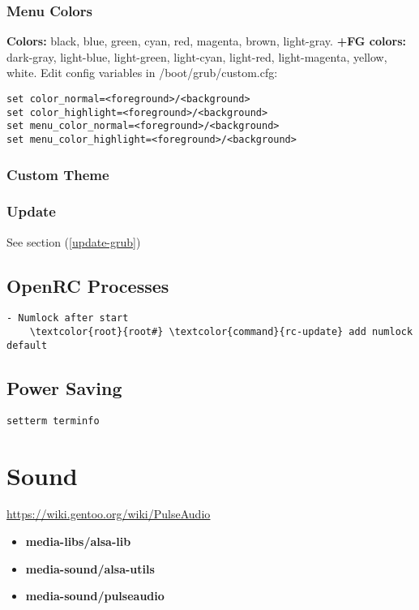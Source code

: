 \documentclass[10pt, a4paper, onecolumn, openany]{book}         %
\begin{document}
\subsection{Menu Colors}
\textbf{Colors:} black, blue, green, cyan, red, magenta, brown, light-gray.\newline
\textbf{+FG colors:} dark-gray, light-blue, light-green, light-cyan, light-red, light-magenta, yellow, white.\newline
Edit config variables in \textcolor{file}{/boot/grub/custom.cfg}:
\begin{Verbatim}[commandchars=\\\{\}]
set color_normal=<foreground>/<background>
set color_highlight=<foreground>/<background>
set menu_color_normal=<foreground>/<background>
set menu_color_highlight=<foreground>/<background>
\end{Verbatim}

\subsection{Custom Theme}

\subsection{Update}
See section (\underline{\ref{update-grub}})

\section{OpenRC Processes}
\begin{Verbatim}[commandchars=\\\{\}]
- Numlock after start
    \textcolor{root}{root#} \textcolor{command}{rc-update} add numlock default
\end{Verbatim}


\section{Power Saving}
\begin{Verbatim}[commandchars=\\\{\}]
setterm terminfo
\end{Verbatim}



\chapter{Sound}
\underline{\url{https://wiki.gentoo.org/wiki/PulseAudio}}\newline
\begin{itemize}
    \item \textbf{media-libs/alsa-lib}
    \item \textbf{media-sound/alsa-utils}
    \item \textbf{media-sound/pulseaudio}
\end{itemize}
\end{document}
